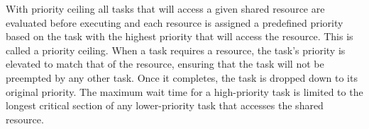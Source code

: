 With priority ceiling all tasks that will access a given shared resource are evaluated before executing and each resource is assigned a predefined priority based on the task with the highest priority that will access the resource. This is called a priority ceiling. When a task requires a resource, the task's priority is elevated to match that of the resource, ensuring that the task will not be preempted by any other task. Once it completes, the task is dropped down to its original priority. The maximum wait time for a high-priority task is limited to the longest critical section of any lower-priority task that accesses the shared resource.

